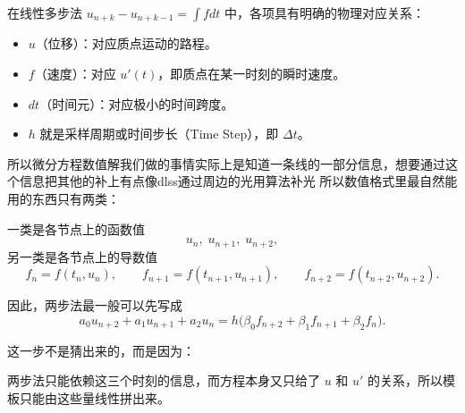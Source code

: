     \begin{dxtips}
        在线性多步法 $u_{n+k} - u_{n+k-1} = \int f dt$ 中，各项具有明确的物理对应关系：
\begin{itemize}
    \item $u$（位移）：对应质点运动的路程。
    \item $f$（速度）：对应 $u'(t)$，即质点在某一时刻的瞬时速度。
    \item $dt$（时间元）：对应极小的时间跨度。
    \item $h$ 就是采样周期或时间步长（Time Step），即 $\Delta t$。
\end{itemize}

    \end{dxtips}


\begin{dxtips}[线性微分方程数值解到底在干什么]所以微分方程数值解我们做的事情实际上是知道一条线的一部分信息，想要通过这个信息把其他的补上有点像dlss通过周边的光用算法补光
    所以数值格式里最自然能用的东西只有两类：

一类是各节点上的函数值
\[
u_n,\;u_{n+1},\;u_{n+2},
\]
另一类是各节点上的导数值
\[
f_n=f(t_n,u_n),\qquad
f_{n+1}=f(t_{n+1},u_{n+1}),\qquad
f_{n+2}=f(t_{n+2},u_{n+2}).
\]

\end{dxtips}
\begin{note}
    因此，两步法最一般可以先写成
\[
a_0u_{n+2}+a_1u_{n+1}+a_2u_n
=
h\bigl(\beta_0f_{n+2}+\beta_1f_{n+1}+\beta_2f_n\bigr).
\]

这一步不是猜出来的，而是因为：

两步法只能依赖这三个时刻的信息，而方程本身又只给了 \(u\) 和 \(u'\) 的关系，所以模板只能由这些量线性拼出来。
\end{note}
